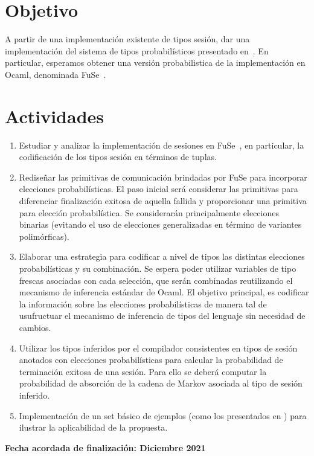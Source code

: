 \documentclass{article}
\begin{document}
\section*{Objetivo}
A partir de una implementaci\'on existente de tipos sesi\'on, dar una implementaci\'on 
del sistema de tipos probabil\'isticos presentado en~\cite{DBLP:conf/concur/InversoMPTT20}.
En particular, esperamos obtener una versi\'on probabilistica de la  implementaci\'on en Ocaml, denominada FuSe~\cite{DBLP:journals/jfp/Padovani17}.



\section*{Actividades}
\begin{enumerate}
\item  Estudiar y analizar la implementaci\'on de sesiones en FuSe~\cite{DBLP:journals/jfp/Padovani17}, en particular, la codificaci\'on de los tipos sesi\'on en t\'erminos de tuplas.
\item  Redise\~nar  las primitivas de comunicaci\'on brindadas por FuSe para incorporar elecciones 
probabil\'isticas. El paso inicial ser\'a considerar  las primitivas para diferenciar finalizaci\'on exitosa de aquella fallida y proporcionar una primitiva para elecci\'on probabil\'istica. Se considerar\'an principalmente  elecciones binarias (evitando el uso de elecciones generalizadas en t\'ermino de variantes polim\'orficas). 
\item Elaborar  una estrategia para codificar a nivel de tipos las distintas elecciones probabil\'isticas y su combinaci\'on. Se espera poder utilizar variables de tipo frescas asociadas con cada selecci\'on, que 
ser\'an combinadas reutilizando el mecanismo de inferencia est\'andar de Ocaml. El objetivo principal, es codificar la informaci\'on sobre las elecciones probabil\'isticas de manera tal de usufructuar el mecanismo de inferencia de tipos del lenguaje sin necesidad de cambios.
\item Utilizar los tipos inferidos por el compilador consistentes en tipos de sesi\'on anotados con elecciones probabil\'isticas para calcular la probabilidad de terminaci\'on exitosa de una sesi\'on. Para ello se deber\'a computar la probabilidad de absorci\'on de la cadena de Markov asociada al tipo de sesi\'on inferido.
\item Implementaci\'on de un set b\'asico de ejemplos (como los presentados en \cite{DBLP:journals/jfp/Padovani17}) para ilustrar la aplicabilidad de la propuesta. 
\end{enumerate}

{\bf Fecha acordada de finalizaci\'on:  Diciembre 2021}


\end{document}
